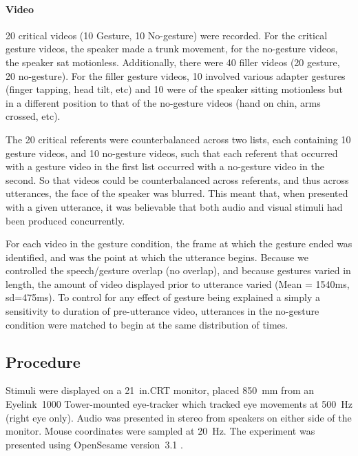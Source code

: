 \documentclass[a4paper,man,natbib]{apa6}
\begin{document}
\paragraph{Video}
20 critical videos (10 Gesture, 10 No-gesture) were recorded. For the critical gesture videos, the speaker made a trunk movement, for the no-gesture videos, the speaker sat motionless.
Additionally, there were 40 filler videos (20 gesture, 20 no-gesture). 
For the filler gesture videos, 10 involved various adapter gestures (finger tapping, head tilt, etc) and 10 were of the speaker sitting motionless but in a different position to that of the no-gesture videos (hand on chin, arms crossed, etc). 

The 20 critical referents were counterbalanced across two lists, each containing 10 gesture videos, and 10 no-gesture videos, such that each referent that occurred with a gesture video in the first list occurred with a no-gesture video in the second.
So that videos could be counterbalanced across referents, and thus across utterances, the face of the speaker was blurred. 
This meant that, when presented with a given utterance, it was believable that both audio and visual stimuli had been produced concurrently. 

For each video in the gesture condition, the frame at which the gesture ended was identified, and was the point at which the utterance begins. 
Because we controlled the speech/gesture overlap (no overlap), and because gestures varied in length, the amount of video displayed prior to utterance varied (Mean = 1540ms, sd=475ms).
To control for any effect of gesture being explained a simply a sensitivity to duration of pre-utterance video, utterances in the no-gesture condition were matched to begin at the same distribution of times.

\subsection{Procedure}
Stimuli were displayed on a 21~in.\@ CRT monitor, placed 850~mm from an Eyelink~1000 Tower-mounted eye-tracker which tracked eye movements at 500~Hz (right eye only). 
Audio was presented in stereo from speakers on either side of the monitor. 
Mouse coordinates were sampled at 20~Hz. 
The experiment was presented using OpenSesame version~3.1 \citep{Mathot2012}.
\end{document}

